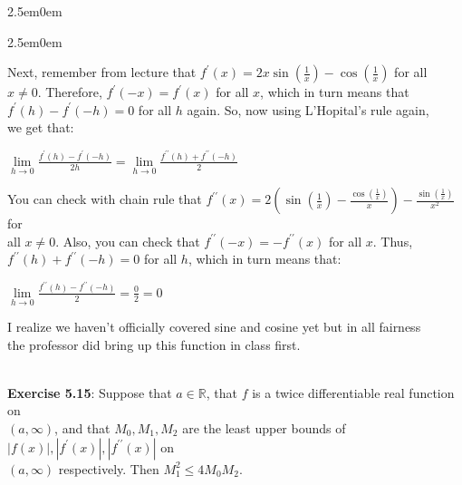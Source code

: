 \documentclass{book}
\newenvironment{myIndent}{%
   \begin{adjustwidth}{2.5em}{0em}%
}{%
   \end{adjustwidth}%
}
\newcommand{\pprime}{{\prime\prime}}
\newcommand{\mySepTwo}[1][.]{%
   {\noindent\color{#1}{\rule{6.5in}{0.5mm}}}\\%
}
\newcommand{\retTwo}{\hfill\bigbreak}
\begin{document}
{\begin{myIndent}
\begin{myIndent}
      Next, remember from lecture that $f^\prime(x) = 2x\sin(\frac{1}{x}) - \cos(\frac{1}{x})$ for all\\ $x \neq 0$. Therefore, $f^\prime(-x) = f^\prime(x)$ for all $x$, which in turn means that\\ $f^\prime(h) - f^\prime(-h) = 0$ for all $h$ again. So, now using L'Hopital's rule again,\\ we get that:

      {\center $\lim\limits_{h\rightarrow 0}\frac{f^\prime(h) - f^\prime(-h)}{2h} = \lim\limits_{h\rightarrow 0}\frac{f^\pprime(h) + f^\pprime(-h)}{2}$\retTwo\par}

      You can check with chain rule that $f^\pprime(x) = 2\left(\sin(\frac{1}{x}) - \frac{\cos(\frac{1}{x})}{x}\right) - \frac{\sin(\frac{1}{x})}{x^2}$ for\\ all $x \neq 0$. Also, you can check that $f^\pprime(-x) = -f^\pprime(x)$ for all $x$. Thus,\\ $f^\pprime(h) + f^\pprime(-h) = 0$ for all $h$, which in turn means that:

      {\center $\lim\limits_{h\rightarrow 0}\frac{f^\pprime(h) - f^\pprime(-h)}{2} = \frac{0}{2} = 0$\retTwo\par}

      I realize we haven't officially covered sine and cosine yet but in all fairness\\ the professor did bring up this function in class first.\retTwo
   \end{myIndent}
\end{myIndent}}

\mySepTwo[Black]

\textbf{Exercise 5.15}: Suppose that $a \in \mathbb{R}$, that $f$ is a twice differentiable real function on\\ $(a, \infty)$, and that $M_0, M_1, M_2$ are the least upper bounds of $|f(x)|, |f^\prime(x)|, |f^\pprime(x)|$ on\\ $(a, \infty)$ respectively. Then $M_1^2 \leq 4M_0M_2$.\\ [-4pt]
\end{document}
